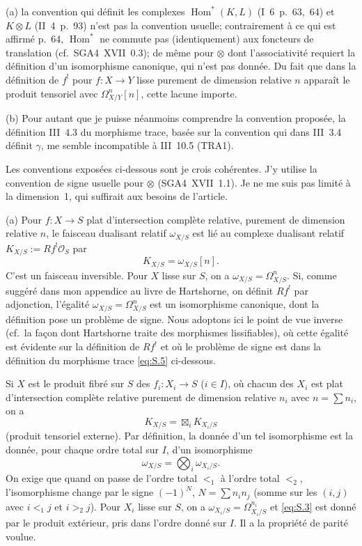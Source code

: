 \documentclass[12pt,a4paper]{article}
\theoremstyle{plain}
\theoremstyle{definition}
\theoremstyle{remark}
\DeclareMathOperator{\Hom}{Hom}
\newcommand{\OO}{\mathcal{O}}
\providecommand{\Hom}{\operatorname{Hom}}
\begin{document}
(a) la convention qui définit les complexes $\Hom^*(K,L)$ (I~6~p.~63,~64) et
$K\otimes L$ (II~4~p.~93) n'est pas la convention usuelle; contrairement à ce qui
est affirmé p.~64, $\Hom^*$ ne commute pas (identiquement) aux foncteurs de
translation (cf.\ SGA4~XVII~0.3); de même pour $\otimes$ dont l'associativité requiert
la définition d'un isomorphisme canonique, qui n'est pas donnée. Du fait que
dans la définition de $f^!$ pour $f:X\to Y$ lisse purement de dimension relative $n$
apparaît le produit tensoriel avec $\Omega^n_{X/Y}[n]$, cette lacune importe.

(b) Pour autant que je puisse néanmoins comprendre la convention proposée,
la définition III~4.3 du morphisme trace, basée sur la convention qui dans
III~3.4 définit $\gamma$, me semble incompatible à III~10.5 (TRA1).

Les conventions exposées ci-dessous sont je crois cohérentes. J'y utilise la
convention de signe usuelle pour $\otimes$ (SGA4~XVII~1.1). Je ne me suis pas limité
à la dimension~1, qui suffirait aux besoins de l'article.

(a) Pour $f:X\to S$ plat d'intersection complète relative, purement de dimension
relative $n$, le faisceau dualisant relatif $\omega_{X/S}$ est lié au complexe dualisant
relatif $K_{X/S}:=Rf^!\OO_S$ par
\begin{equation}\label{eq:S.1}
K_{X/S}=\omega_{X/S}[n].
\end{equation}
C'est un faisceau inversible. Pour $X$ lisse sur $S$, on a
$\omega_{X/S}=\Omega^n_{X/S}$. Si, comme suggéré dans mon appendice au livre de
Hartshorne, on définit $Rf^!$ par adjonction, l'égalité
$\omega_{X/S}=\Omega^n_{X/S}$ est un isomorphisme canonique, dont la définition pose
un problème de signe. Nous adoptons ici le point de vue inverse (cf.\ la façon
dont Hartshorne traite des morphismes lissifiables), où cette égalité est évidente
sur la définition de $Rf^!$ et où le problème de signe est dans la définition du morphisme
trace \eqref{eq:S.5} ci-dessous.

Si $X$ est le produit fibré sur $S$ des $f_i:X_i\to S$ ($i\in I$), où chacun des $X_i$
est plat d'intersection complète relative purement de dimension relative $n_i$ avec
$n=\sum n_i$, on a
\begin{equation}\label{eq:S.2}
K_{X/S}=\boxtimes_i K_{X_i/S}
\end{equation}
(produit tensoriel externe). Par définition, la donnée d'un tel isomorphisme est
la donnée, pour chaque ordre total sur $I$, d'un isomorphisme
\begin{equation}\label{eq:S.3}
\omega_{X/S}=\bigotimes_i \omega_{X_i/S}.
\end{equation}
On exige que quand on passe de l'ordre total $<_1$ à l'ordre total $<_2$, l'isomorphisme
change par le signe $(-1)^N$, $N=\sum n_in_j$ (somme sur les $(i,j)$ avec $i<_1 j$
et $i>_2 j$). Pour $X_i$ lisse sur $S$, on a $\omega_{X_i/S}=\Omega^{n_i}_{X_i/S}$ et \eqref{eq:S.3}
est donné par le produit extérieur, pris dans l'ordre donné sur $I$. Il a la propriété de
parité voulue.
\end{document}
